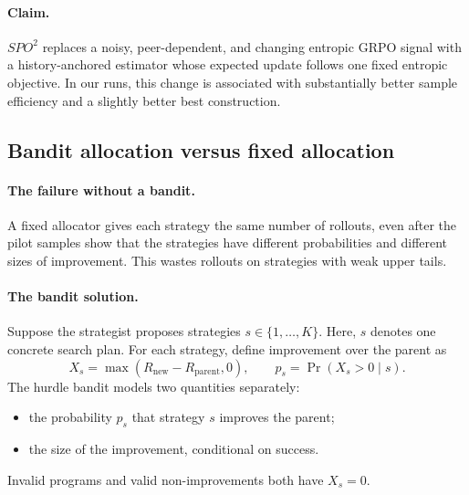 
\paragraph{Claim.}
$SPO^2$ replaces a noisy, peer-dependent, and changing entropic GRPO signal with
a history-anchored estimator whose expected update follows one fixed entropic
objective. In our runs, this change is associated with substantially better
sample efficiency and a slightly better best construction.


\subsection*{Bandit allocation versus fixed allocation}

\paragraph{The failure without a bandit.}
A fixed allocator gives each strategy the same number of rollouts, even after
the pilot samples show that the strategies have different probabilities and
different sizes of improvement. This wastes rollouts on strategies with weak
upper tails.

\paragraph{The bandit solution.}
Suppose the strategist proposes strategies $s\in\{1,\ldots,K\}$. Here, $s$
denotes one concrete search plan. For each strategy, define improvement over
the parent as
\[
X_s=\max(R_{\mathrm{new}}-R_{\mathrm{parent}},0),
\qquad
p_s=\Pr(X_s>0\mid s).
\]
The hurdle bandit models two quantities separately:
\begin{itemize}
    \item the probability $p_s$ that strategy $s$ improves the parent;
    \item the size of the improvement, conditional on success.
\end{itemize}
Invalid programs and valid non-improvements both have $X_s=0$.

